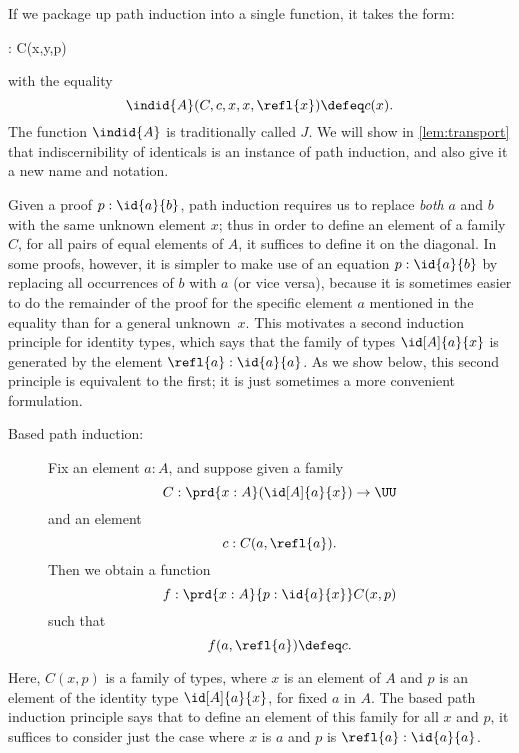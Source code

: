 If we package up path induction into a single function, it takes the form:
%
\begin{narrowmultline*}
   :  
   \to 
  \narrowbreak
     C(x,y,p)
\end{narrowmultline*}
with the equality
\[ \indid{A}(C,c,x,x,\refl{x}) \defeq c(x). \]
The function $ \indid{A}$ is traditionally called $J$.
%
We will show in \cref{lem:transport} that indiscernibility of identicals is an instance of path induction, and also give it a new name and notation.

\mentalpause

Given a proof $p : \id{a}{b}$,
path induction requires us to replace \emph{both} $a$ and $b$ with the same unknown element $x$; thus in order to define an element of a family
$C$, for all pairs of equal elements of $A$, it suffices to define it on the diagonal.
In some proofs, however, it is simpler to make use of an equation $p : \id{a}{b}$ by replacing all occurrences of $b$ with $a$ (or vice versa), because it is sometimes easier to do the remainder of the proof for the specific element $a$ mentioned in the equality than for a general unknown~$x$.  This motivates a second induction principle for identity types, which says that the family of types $\id[A]{a}{x}$ is generated by the element $\refl{a} : \id{a}{a}$.  As we show below, this second principle is equivalent to the first; it is just sometimes a more convenient formulation.

%
%
\begin{description}
\item[Based path induction:] 
  Fix an element $a:A$, and suppose given a family
  \[ C : \prd{x:A} (\id[A]{a}{x}) \to \UU \]
  and an element
  \[ c : C(a,\refl{a}). \]
  Then we obtain a function
  \[ f : \prd{x:A}{p:\id{a}{x}} C(x,p) \]
  such that
  \[ f(a,\refl{a}) \defeq c.\]
\end{description}

Here, $C(x,p)$ is a family of types, where $x$ is an element of $A$ and $p$ is an element of the identity type $\id[A]{a}{x}$, for fixed $a$ in $A$. The based path induction principle says that to define an element of this family for all $x$ and $p$, it suffices to consider
just the case where $x$ is $a$ and $p$ is $\refl{a} : \id{a}{a}$.

